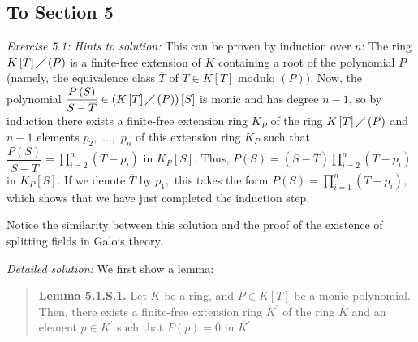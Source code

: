 \documentclass[numbers=enddot,12pt,final,onecolumn,notitlepage]{scrartcl}%
\begin{document}
\subsection{To Section 5}

\textit{Exercise 5.1: Hints to solution:} This can be proven by induction over
$n$: The ring $K\left[  T\right]  \diagup\left(  P\right)  $ is a finite-free
extension of $K$ containing a root of the polynomial $P$ (namely, the
equivalence class $\overline{T}$ of $T\in K\left[  T\right]  $ modulo $\left(
P\right)  $). Now, the polynomial $\dfrac{P\left(  S\right)  }{S-\overline{T}%
}\in\left(  K\left[  T\right]  \diagup\left(  P\right)  \right)  \left[
S\right]  $ is monic and has degree $n-1$, so by induction there exists a
finite-free extension ring $K_{P}$ of the ring $K\left[  T\right]
\diagup\left(  P\right)  $ and $n-1$ elements $p_{2},$ $...,$ $p_{n}$ of this
extension ring $K_{P}$ such that $\dfrac{P\left(  S\right)  }{S-\overline{T}%
}=\prod\limits_{i=2}^{n}\left(  T-p_{i}\right)  $ in $K_{P}\left[  S\right]
$. Thus, $P\left(  S\right)  =\left(  S-\overline{T}\right)  \prod
\limits_{i=2}^{n}\left(  T-p_{i}\right)  $ in $K_{P}\left[  S\right]  $. If we
denote $\overline{T}$ by $p_{1},$ this takes the form $P\left(  S\right)
=\prod\limits_{i=1}^{n}\left(  T-p_{i}\right)  ,$ which shows that we have
just completed the induction step.

Notice the similarity between this solution and the proof of the existence of
splitting fields in Galois theory.

\textit{Detailed solution:} We first show a lemma:

\begin{quote}
\textbf{Lemma 5.1.S.1.} Let $K$ be a ring, and $P\in K\left[  T\right]  $ be a
monic polynomial. Then, there exists a finite-free extension ring $K^{\prime}$
of the ring $K$ and an element $p\in K^{\prime}$ such that $P\left(  p\right)
=0$ in $K^{\prime}$.
\end{quote}
\end{document}
